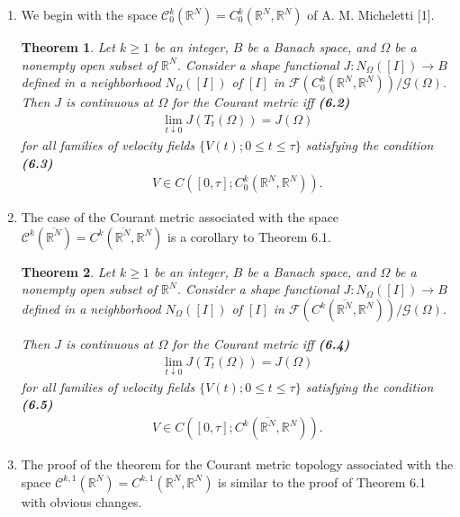 \documentclass{book}
\numberwithin{equation}{section}
\newtheorem{theorem}{Theorem}[section]
\newtheorem{remark}{Remark}[section]
\begin{document}
\begin{enumerate}
    \begin{remark}
        An obvious consequence of Theorems 6.1-6.3 is that when a shape functional is semidifferentiable in the sense of Definition 3.2 (Hadamard), it is continuous at that point for the Courant metric topology in complete analogy with the classical Euclidean calculus.
    \end{remark}
    \item We begin with the space $\mathcal{C}_0^k(\mathbb{R}^N) = C_0^k(\mathbb{R}^N,\mathbb{R}^N)$ of A. M. Micheletti [1].
    
    \begin{theorem}
        Let $k\ge 1$ be an integer, $B$ be a Banach space, and $\Omega$ be a nonempty open subset of $\mathbb{R}^N$. Consider a shape functional $J:N_\Omega([I])\to B$ defined in a neighborhood $N_\Omega([I])$ of $[I]$ in $\mathcal{F}(C_0^k(\mathbb{R}^N,\mathbb{R}^N))/\mathcal{G}(\Omega)$. Then $J$ is continuous at $\Omega$ for the Courant metric iff \textbf{(6.2)}
        \begin{align*}
            \lim_{t\downarrow 0} J\left(T_t(\Omega)\right) = J(\Omega)
        \end{align*}
        for all families of velocity fields $\{V(t);0\le t\le\tau\}$ satisfying the condition \textbf{(6.3)}
        \begin{align*}
            V\in C([0,\tau];C_0^k(\mathbb{R}^N,\mathbb{R}^N)).
        \end{align*}
    \end{theorem}
    \item The case of the Courant metric associated with the space $\mathcal{C}^k(\overline{\mathbb{R}^N}) = C^k(\overline{\mathbb{R}^N},\mathbb{R}^N)$ is a corollary to Theorem 6.1.
    
    \begin{theorem}
        Let $k\ge 1$ be an integer, $B$ be a Banach space, and $\Omega$ be a nonempty open subset of $\mathbb{R}^N$. Consider a shape functional $J:N_\Omega([I])\to B$ defined in a neighborhood $N_\Omega([I])$ of $[I]$ in $\mathcal{F}(C^k(\overline{\mathbb{R}^N},\mathbb{R}^N))/\mathcal{G}(\Omega)$.
        
        Then $J$ is continuous at $\Omega$ for the Courant metric iff \textbf{(6.4)}
        \begin{align*}
            \lim_{t\downarrow 0} J\left(T_t(\Omega)\right) = J(\Omega)
        \end{align*}
        for all families of velocity fields $\{V(t);0\le t\le\tau\}$ satisfying the condition \textbf{(6.5)}
        \begin{align*}
            V\in C([0,\tau];C^k(\overline{\mathbb{R}^N},\mathbb{R}^N)).
        \end{align*}
    \end{theorem}
    \item The proof of the theorem for the Courant metric topology associated with the space $\mathcal{C}^{k,1}(\mathbb{R}^N) = C^{k,1}(\mathbb{R}^N,\mathbb{R}^N)$ is similar to the proof of Theorem 6.1 with obvious changes.
    

\end{enumerate}
\end{document}
